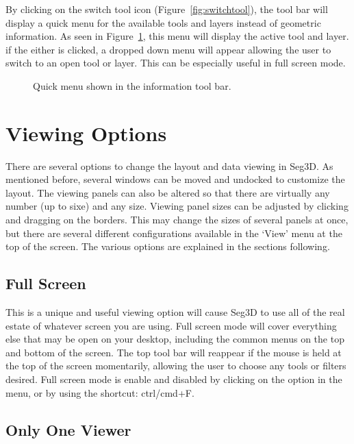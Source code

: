 \documentclass[fleqn,11pt,openany]{book}
\begin{document}
By clicking on the switch tool icon (Figure~\ref{fig:switchtool}), the tool bar will display a quick menu for the available tools and layers instead of geometric information.  As seen in Figure~\ref{fig:quickmenu}, this menu will display the active tool and layer.  if the either is clicked, a dropped down menu will appear allowing the user to switch to an open tool or layer.  This can be especially useful in full screen mode.  

\begin{figure}[h!]
\caption{Quick menu shown in the information tool bar.}\label{fig:quickmenu}
\end{figure}


\section{Viewing Options}
\label{sec:viewing}

There are several options to change the layout and data viewing in Seg3D.  As mentioned before, several windows can be moved and undocked to customize the layout.  The viewing panels can also be altered so that there are virtually any number (up to sixe) and any size.  Viewing panel sizes can be adjusted by clicking and dragging on the borders.  This may change the sizes of several panels at once, but there are several different configurations available in the `View' menu at the top of the screen.  The various options are explained in the sections following.  

\subsection{Full Screen}

This is a unique and useful viewing option will cause Seg3D to use all of the real estate of whatever screen you are using.  Full screen mode will cover everything else that may be open on your desktop, including the common menus on the top and bottom of the screen.  The top tool bar will reappear if the mouse is held at the top of the screen momentarily, allowing the user to choose any tools or filters desired.  Full screen mode is enable and disabled by clicking on the option in the menu, or by using the shortcut: ctrl/cmd+F.  

\subsection{Only One Viewer}
\end{document}
